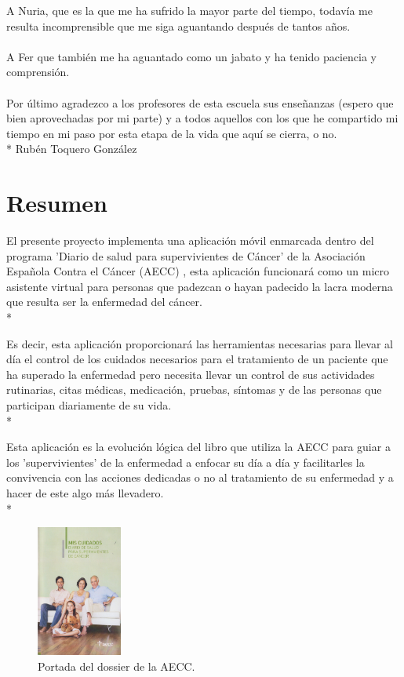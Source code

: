 \documentclass[b5paper,10pt,twoside]{book}
\begin{document}
{		A Nuria, que es la que me ha sufrido la mayor parte del tiempo, todavía me resulta incomprensible que me siga aguantando después de tantos años.\\\\
		A Fer que también me ha aguantado como un jabato y ha tenido paciencia y comprensión.\\\\
		Por último agradezco a los profesores de esta escuela sus enseñanzas (espero que bien aprovechadas por mi parte) y a todos aquellos con los que he compartido mi tiempo en mi paso por esta etapa de la vida que aquí se cierra, o no.\\*
		Rubén Toquero González} 
	

	\chapter*{Resumen}
		El presente proyecto implementa una aplicación móvil enmarcada dentro del programa 'Diario de salud para supervivientes de Cáncer' de la Asociación Española Contra el Cáncer (AECC) \cite{aecc}, esta aplicación funcionará como un micro asistente virtual para personas que padezcan o hayan padecido la lacra moderna que resulta ser la enfermedad del cáncer.\\*
		
		Es decir, esta aplicación proporcionará las herramientas necesarias para llevar al día el control de los cuidados necesarios para el tratamiento de un paciente que ha superado la enfermedad pero necesita llevar un control de sus actividades rutinarias, citas médicas, medicación, pruebas, síntomas y de las personas que participan diariamente de su vida.\\*
		
		Esta aplicación es la evolución lógica del libro que utiliza la AECC para guiar a los 'supervivientes' de la enfermedad a enfocar su día a día y facilitarles la convivencia con las acciones dedicadas o no al tratamiento de su enfermedad y a hacer de este algo más llevadero.\\*
		
	 	
	\begin{figure}[h]
		\centering
		\includegraphics[width=0.25\textwidth]{fotointro}
		\caption{Portada del dossier de la AECC.}
		\label{fig:mesh1}
	\end{figure}
	 
\end{document}
